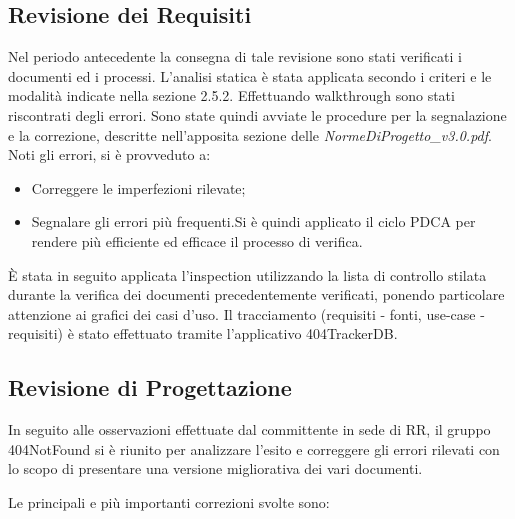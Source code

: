 \subsection{Revisione dei Requisiti}
Nel periodo antecedente la consegna di tale revisione sono stati verificati i documenti ed i processi.
L'analisi statica è stata applicata secondo i criteri e le modalità indicate nella sezione 2.5.2. Effettuando walkthrough sono stati riscontrati degli errori. Sono state quindi avviate le procedure per la segnalazione e la correzione, descritte nell'apposita sezione delle \textit{NormeDiProgetto_v3.0.pdf}.
Noti gli errori, si è provveduto a:
\begin{itemize}
	\item Correggere le imperfezioni rilevate;
	\item Segnalare gli errori più frequenti.Si è quindi applicato il ciclo PDCA per rendere più efficiente ed efficace il processo di verifica.
\end{itemize}
È stata in seguito applicata l'inspection utilizzando la lista di controllo stilata durante la verifica dei documenti precedentemente verificati, ponendo particolare attenzione ai grafici dei casi d'uso.
Il tracciamento (requisiti - fonti, use-case - requisiti) è stato effettuato tramite l'applicativo 404TrackerDB.
\newpage
\subsection{Revisione di Progettazione}
In seguito alle osservazioni effettuate dal committente in sede di RR, il gruppo 404NotFound si è riunito per analizzare l'esito e correggere gli errori rilevati con lo scopo di presentare una versione migliorativa dei vari documenti.

Le principali e più importanti correzioni svolte sono:

